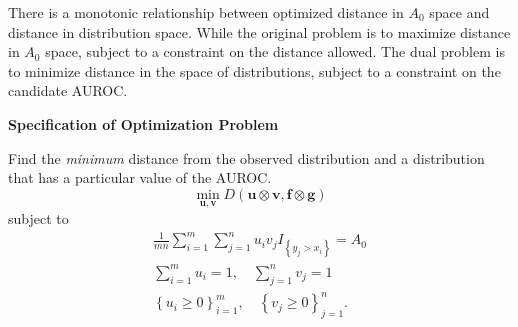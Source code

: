 There is a monotonic relationship between optimized distance in $A_0$ space and distance in distribution space.
While the original problem is to maximize distance in $A_0$ space, subject to a constraint on the distance allowed.
The dual problem is to minimize distance in the space of distributions, subject to a constraint on the candidate AUROC.



\textbf{Specification of Optimization Problem}

Find the \emph{minimum} distance from the observed distribution and a distribution that has a particular value of the AUROC.
%
\begin{equation}
    \min_{\mathbf{u}, \mathbf{v}}
        D(\mathbf{u} \otimes \mathbf{v}, \mathbf{f} \otimes \mathbf{g})
\end{equation}
%
\noindent subject to
%
\begin{align}
    \frac{1}{m n} \sum_{i = 1}^{m} \sum_{j = 1}^{n} u_i v_j I_{\left\{ y_j > x_i \right\}} = A_0 \\
    \sum_{i = 1}^{m} u_i = 1, \quad \sum_{j = 1}^{n} v_j = 1 \\
    \left\{ u_i  \geq 0 \right\}_{i=1}^{m}, \quad \left\{ v_j \geq 0 \right\}_{j=1}^{n}.
\end{align}
%










